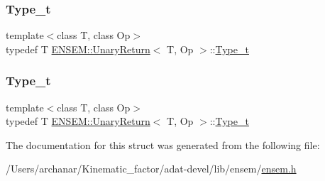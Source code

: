 \subsubsection{\texorpdfstring{Type\_t}{Type\_t}\hspace{0.1cm}{\footnotesize\ttfamily [2/3]}}
{\footnotesize\ttfamily template$<$class T, class Op$>$ \\
typedef T \mbox{\hyperlink{structENSEM_1_1UnaryReturn}{E\+N\+S\+E\+M\+::\+Unary\+Return}}$<$ T, Op $>$\+::\mbox{\hyperlink{structENSEM_1_1UnaryReturn_a16a257c6ea03664cc3e42cbfe2ca219d}{Type\+\_\+t}}}

\mbox{\label{structENSEM_1_1UnaryReturn_a16a257c6ea03664cc3e42cbfe2ca219d}} 
\subsubsection{\texorpdfstring{Type\_t}{Type\_t}\hspace{0.1cm}{\footnotesize\ttfamily [3/3]}}
{\footnotesize\ttfamily template$<$class T, class Op$>$ \\
typedef T \mbox{\hyperlink{structENSEM_1_1UnaryReturn}{E\+N\+S\+E\+M\+::\+Unary\+Return}}$<$ T, Op $>$\+::\mbox{\hyperlink{structENSEM_1_1UnaryReturn_a16a257c6ea03664cc3e42cbfe2ca219d}{Type\+\_\+t}}}



The documentation for this struct was generated from the following file\+:\begin{DoxyCompactItemize}
\item 
/\+Users/archanar/\+Kinematic\+\_\+factor/adat-\/devel/lib/ensem/\mbox{\hyperlink{adat-devel_2lib_2ensem_2ensem_8h}{ensem.\+h}}\end{DoxyCompactItemize}
